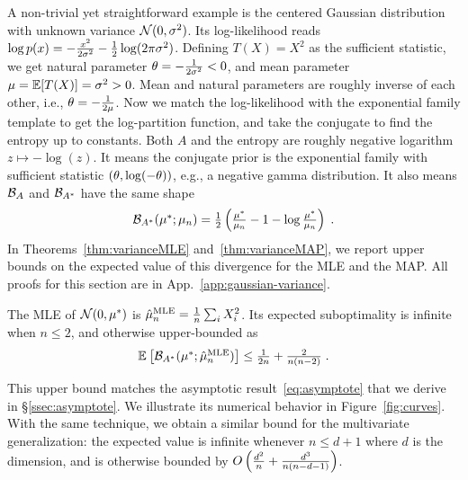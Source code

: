A non-trivial yet straightforward example is the centered Gaussian distribution with unknown variance ${\mathcal N}(0,\sigma^2)$.
Its log-likelihood reads $\log p(x) = -\frac{x^2}{2 \sigma^2} - \frac{1}{2}\log(2\pi \sigma^2)$.
Defining $T(X)=X^2$ as the sufficient statistic, we get natural parameter $\theta = -\frac{1}{2 \sigma^2} <0$, and mean parameter $\mu=\operatorname{\mathbb{E}}[T(X)] = \sigma^2 >0$.
Mean and natural parameters are roughly inverse of each other, i.e., $\theta = -\frac{1}{2 \mu}$.
Now we match the log-likelihood with the exponential family template to get the log-partition function, and take the conjugate to find the entropy
up to constants.
Both $A$ and  the entropy are roughly negative logarithm $z\mapsto - \log(z)$.
It means the conjugate prior is the exponential family with sufficient statistic $(\theta, \log(-\theta) )$, e.g., a negative gamma distribution.
It also means ${\mathcal B}_A$ and ${\mathcal B}_{A^*}$ have the same shape
\begin{align}
	\textstyle {\mathcal B}_{A^*}( \mu^*; \mu_n)
	= \frac{1}{2} \left ( \frac{\mu^*}{ \mu_n} - 1 - \log  \frac{\mu^*}{ \mu_n} \right) \; .
\end{align}
In Theorems~\ref{thm:varianceMLE} and~\ref{thm:varianceMAP}, we report upper bounds on the expected value of this divergence for the MLE and the MAP.
All proofs for this section are in App.~\ref{app:gaussian-variance}.
\begin{theorem}
\label{thm:varianceMLE}
	The MLE of ${\mathcal N}(0,\mu^*)$ is $\hat {\mu}_n^\text{MLE} = \frac{1}{n} \sum_i X_i^2 $.
	Its expected suboptimality is infinite when $n\leq 2$, and otherwise upper-bounded as
	\begin{align}
		 \textstyle  \mathbb{E}_{} \left[ {\mathcal B}_{A^*}( \mu^*; \hat {\mu}_n^\text{MLE})  \right] 
			\leq \frac{1}{2n} +\frac{2}{n(n-2)} \; .
			\label{eq:MLE_rate}
	\end{align}
\end{theorem}
This upper bound matches the asymptotic result~\eqref{eq:asymptote} that we derive in \S\ref{ssec:asymptote}.
We illustrate its numerical behavior in Figure~\ref{fig:curves}.
With the same technique, we obtain a similar bound for the multivariate generalization: the expected value is infinite whenever $n \leq d+1$ where $d$ is the dimension, and is otherwise bounded by $O\left(\frac{d^2}{n} + \frac{d^3}{n(n-d-1)}\right)$.

